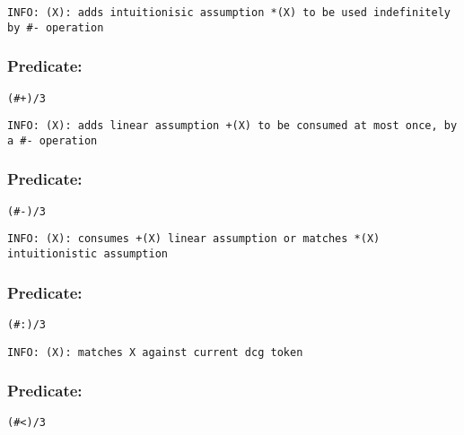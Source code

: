 {\small \begin{verbatim}
INFO: (X): adds intuitionisic assumption *(X) to be used indefinitely by #- operation

\end{verbatim}}

\subsubsection{Predicate:} \label{V35WV43WV95W3}

\begin{verbatim}
(#+)/3
\end{verbatim}

{\small \begin{verbatim}
INFO: (X): adds linear assumption +(X) to be consumed at most once, by a #- operation

\end{verbatim}}

\subsubsection{Predicate:} \label{V35WV45WV95W3}

\begin{verbatim}
(#-)/3
\end{verbatim}

{\small \begin{verbatim}
INFO: (X): consumes +(X) linear assumption or matches *(X) intuitionistic assumption

\end{verbatim}}

\subsubsection{Predicate:} \label{V35WV58WV95W3}

\begin{verbatim}
(#:)/3
\end{verbatim}

{\small \begin{verbatim}
INFO: (X): matches X against current dcg token

\end{verbatim}}

\subsubsection{Predicate:} \label{V35WV60WV95W3}

\begin{verbatim}
(#<)/3
\end{verbatim}

